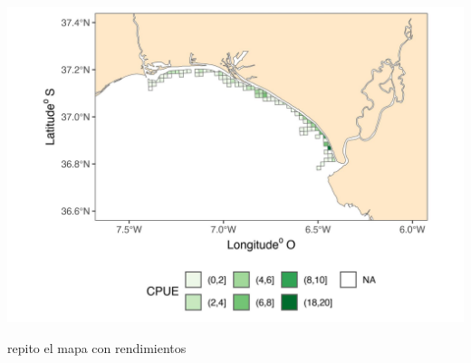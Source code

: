\documentclass[
]{article}
\begin{document}
\begin{center}\includegraphics{SAR_Method_files/figure-latex/unnamed-chunk-29-1} \end{center}

repito el mapa con rendimientos
\end{document}
